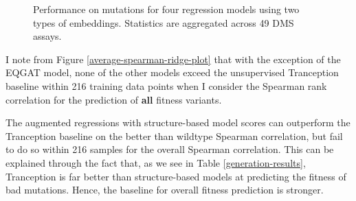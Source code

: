 \begin{figure}[!htb]
    \centering
    \hspace{0.1in}
    \caption{Performance on mutations for four regression models using two types of embeddings. Statistics are aggregated across 49 DMS assays.}
    \label{one-hot-regression}
\end{figure}

I note from Figure \ref{average-spearman-ridge-plot} that with the exception of the EQGAT model, none of the other models exceed the unsupervised Tranception baseline within 216 training data points when I consider the Spearman rank correlation for the prediction of \textbf{all} fitness variants.

The augmented regressions with structure-based model scores can outperform the Tranception baseline on the better than wildtype Spearman correlation, but fail to do so within 216 samples for the overall Spearman correlation. This can be explained through the fact that, as we see in Table \ref{generation-results}, Tranception is far better than structure-based models at predicting the fitness of bad mutations. Hence, the baseline for overall fitness prediction is stronger. 



